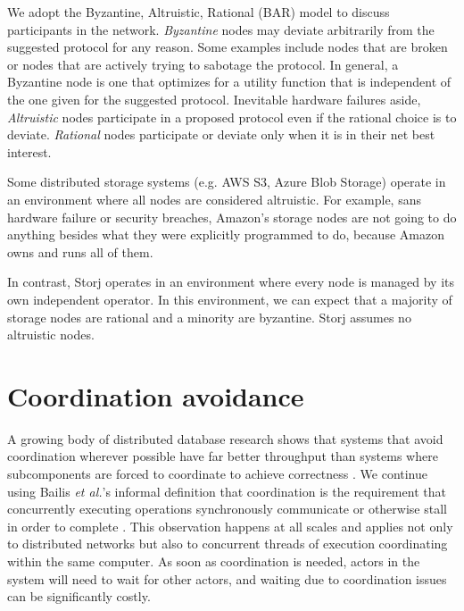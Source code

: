\documentclass[11pt,fleqn,openany]{book}
\begin{document}
We adopt the Byzantine, Altruistic, Rational (BAR) model \cite{bar} to discuss
participants in the network.
{\em Byzantine} nodes may deviate arbitrarily from the suggested protocol for
any reason. Some examples include nodes that are broken or nodes that
are actively trying to sabotage the protocol. In general, a Byzantine node is
one that optimizes for a utility function that is independent of the one
given for the suggested protocol.
Inevitable hardware failures aside, {\em Altruistic} nodes
participate in a proposed protocol even if the rational choice is to deviate.
{\em Rational} nodes participate or deviate only when it
is in their net best interest.

Some distributed storage systems (e.g. AWS S3, Azure Blob Storage)
operate in an environment
where all nodes are considered altruistic. For example, sans hardware failure
or security breaches, Amazon's storage nodes
are not going to do anything besides what they were explicitly programmed to do,
because Amazon owns and runs all of them.

In contrast, Storj operates in an environment where every node is
managed by its own independent operator.
In this environment, we can expect that a majority
of storage nodes are rational and a minority are byzantine. Storj assumes no
altruistic nodes.

\section{Coordination avoidance}\label{sec:coordination-avoidance}

A growing body of distributed database research shows that systems that
avoid coordination wherever possible have far better throughput than systems
where subcomponents are forced to coordinate to achieve correctness
\cite{cap1, cap2, consistency-vs-latency, hat, i-confluence, anna,
calm1, calm2}.
We continue using Bailis {\em et al.}'s informal definition
that coordination is the requirement that concurrently executing operations
synchronously communicate or otherwise stall in order to complete
\cite{i-confluence}.
This observation happens at all scales and applies not only to distributed
networks but also to
concurrent threads of execution coordinating within the same computer.
As soon as coordination is needed, actors in the system will need to wait for
other actors, and waiting due to coordination issues can be significantly
costly.
\end{document}
